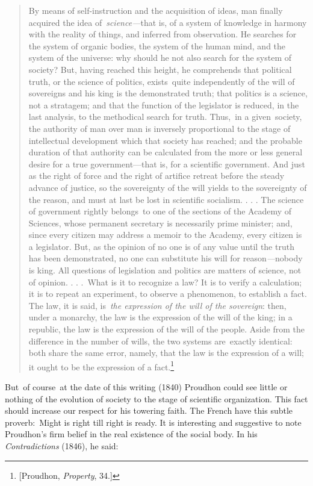 \documentclass[openany,nobib]{tufte-book}
\begin{document}
\begin{quote}
By means of self-instruction and the acquisition of ideas, man finally
acquired the idea of~\emph{science---}that is, of a system of knowledge
in harmony with the reality of things, and inferred from observation. He
searches for the system of organic bodies, the system of the human mind,
and the system of the universe: why should he not also search for the
system of society? But, having reached this height, he comprehends that
political truth, or the science of politics, exists~quite independently
of the will of sovereigns and his king is the demonstrated truth; that
politics is a science, not a stratagem; and that the function of the
legislator is reduced, in the last analysis, to the methodical search
for truth. Thus,~in a given~society, the authority of man over man is
inversely proportional to the stage of intellectual development which
that society has reached; and the probable duration of that authority
can be calculated from the more or less general desire for a true
government---that is, for a scientific government. And just as the right
of force and the right of artifice retreat before the steady advance of
justice, so the sovereignty of the will yields to the sovereignty of the
reason, and must at last be lost in scientific socialism. . . . The
science of government rightly belongs~to one of the sections of the
Academy of Sciences, whose permanent secretary is necessarily prime
minister; and, since every citizen may address a memoir to the Academy,
every citizen is a legislator. But, as the opinion of no one is of any
value until the truth has been demonstrated, no one can substitute his
will for reason\emph{---}nobody is king. All questions of legislation
and politics are matters of science, not of opinion. . . .~What is it to
recognize a law? It is to verify a calculation; it is to repeat an
experiment, to observe a phenomenon, to establish a fact. The law, it is
said, is~\emph{the expression of the will of the sovereign}: then, under
a monarchy, the law is the expression of the will of the king; in a
republic, the law is the expression of the will of the people. Aside
from the difference in the number of wills, the two systems are~exactly
identical: both share the same error, namely, that the law is the
expression of a will; it ought to be the expression of a
fact.\footnote{{[}Proudhon, \emph{Property}, 34.{]}}~~
\end{quote}

But~of course~at the date of this writing (1840) Proudhon could see
little or nothing of the evolution of society to the stage of scientific
organization. This fact should increase our respect for his towering
faith. The French have this subtle proverb:~Might is right till right is
ready. It is interesting and suggestive to note Proudhon's firm belief
in the real existence of the social body. In his \emph{Contradictions
}(1846), he said:~
\end{document}
